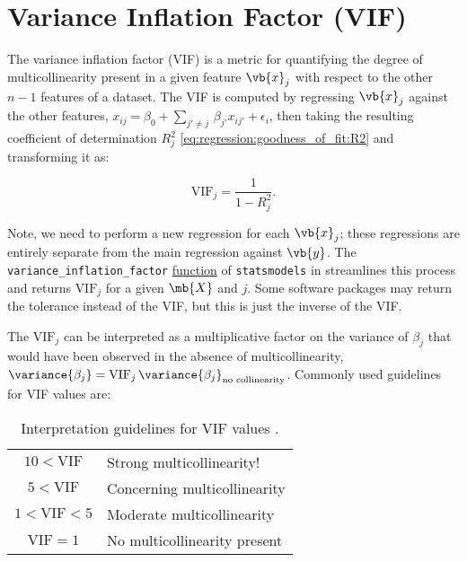 \section{Variance Inflation Factor (VIF)}
\label{regression:VIF}

The variance inflation factor (VIF) is a metric for quantifying
the degree of multicollinearity present in a given feature $\vb{x}_{j}$
with respect to the other $n-1$ features of a dataset.
The VIF is computed by regressing $\vb{x}_{j}$ against the other features,
$x_{ij} = \beta_{0} + \sum_{j' \neq j}\, \beta_{j'} x_{ij'} + \epsilon_{i}$,
then taking the resulting coefficient of determination $R^{2}_{j}$ \cref{eq:regression:goodness_of_fit:R2}
and transforming it as:

\begin{equation}\label{eq:regression:VIF}
\text{VIF}_{j} = \frac{1}{1 - R_{j}^{2}}.
\end{equation}

\noindent Note, we need to perform a new regression for each $\vb{x}_{j}$;
these regressions are entirely separate from the main regression against $\vb{y}$.
The \texttt{variance\_inflation\_factor}
\href{https://www.statsmodels.org/stable/generated/statsmodels.stats.outliers_influence.variance_inflation_factor.html}{function}
of \texttt{statsmodels} in \python
streamlines this process and returns $\text{VIF}_{j}$ for a given $\mb{X}$ and $j$.
Some software packages may return the tolerance instead of the VIF,
but this is just the inverse of the VIF.

The $\text{VIF}_{j}$ can be interpreted as
a multiplicative factor on the variance of $\beta_{j}$
that would have been observed in the absence of multicollinearity,
\ie $\variance{\beta_{j}} = \text{VIF}_{j} \, \variance{\beta_{j}}_{\text{no collinearity}}$.
Commonly used guidelines for VIF values are:

\begin{table}[H]
  \centering
  \begin{tabular}{c | p{5cm}}
$10 < \text{VIF}$ & Strong multicollinearity! \\
$5 < \text{VIF}$ & Concerning multicollinearity \\
$ 1 < \text{VIF} < 5$ & Moderate multicollinearity \\
$\text{VIF} = 1$ & No multicollinearity present
  \end{tabular}
  \caption{Interpretation guidelines for VIF values \cite{Kutner2004,Sheather2009}.}
  \label{table:VIF_guidelines}
\end{table}

